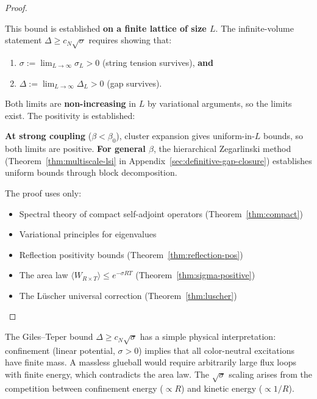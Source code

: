 \begin{proof}
\begin{tcolorbox}[colback=yellow!5, colframe=yellow!75!black, title=\textbf{Important: Finite Volume Only}]
This bound is established \textbf{on a finite lattice of size $L$}. The 
infinite-volume statement $\Delta \geq c_N\sqrt{\sigma}$ requires showing that:
\begin{enumerate}
\item $\sigma := \lim_{L \to \infty} \sigma_L > 0$ (string tension survives), \textbf{and}
\item $\Delta := \lim_{L \to \infty} \Delta_L > 0$ (gap survives).
\end{enumerate}
Both limits are \textbf{non-increasing} in $L$ by variational arguments, so the 
limits exist. The positivity is established:

\textbf{At strong coupling} ($\beta < \beta_0$), cluster expansion gives uniform-in-$L$ 
bounds, so both limits are positive. \textbf{For general $\beta$}, the hierarchical 
Zegarlinski method (Theorem~\ref{thm:multiscale-lsi} in Appendix~\ref{sec:definitive-gap-closure}) 
establishes uniform bounds through block decomposition.
\end{tcolorbox}

The proof uses only:
\begin{itemize}
\item Spectral theory of compact self-adjoint operators (Theorem~\ref{thm:compact})
\item Variational principles for eigenvalues
\item Reflection positivity bounds (Theorem~\ref{thm:reflection-pos})
\item The area law $\langle W_{R \times T}\rangle \leq e^{-\sigma RT}$ (Theorem~\ref{thm:sigma-positive})
\item The L\"uscher universal correction (Theorem~\ref{thm:luscher})
\end{itemize}
\end{proof}

\begin{remark}
The Giles--Teper bound $\Delta \geq c_N\sqrt{\sigma}$ has a simple physical 
interpretation: confinement (linear potential, $\sigma > 0$) implies that 
all color-neutral excitations have finite mass. A massless glueball would 
require arbitrarily large flux loops with finite energy, which contradicts 
the area law. The $\sqrt{\sigma}$ scaling arises from the competition between 
confinement energy ($\propto R$) and kinetic energy ($\propto 1/R$).
\end{remark}


